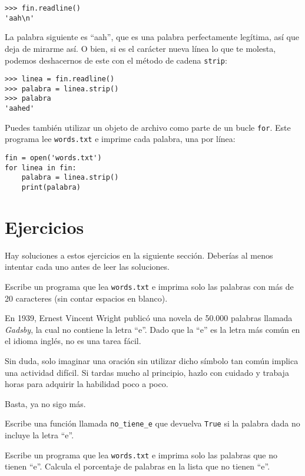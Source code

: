 \documentclass[10pt]{book}
\begin{document}
\begin{verbatim}
>>> fin.readline()
'aah\n'
\end{verbatim}
%
La palabra siguiente es ``aah'', que es una palabra perfectamente legítima,
así que deja de mirarme así.
O bien, si es el carácter nueva línea lo que te molesta,
podemos deshacernos de este con el método de cadena {\tt strip}:

\begin{verbatim}
>>> linea = fin.readline()
>>> palabra = linea.strip()
>>> palabra
'aahed'
\end{verbatim}
%
Puedes también utilizar un objeto de archivo como parte de un bucle {\tt for}.
Este programa lee {\tt words.txt} e imprime cada palabra, una
por línea:

\begin{verbatim}
fin = open('words.txt')
for linea in fin:
    palabra = linea.strip()
    print(palabra)
\end{verbatim}
%

\section{Ejercicios}

Hay soluciones a estos ejercicios en la siguiente sección.
Deberías al menos intentar cada uno antes de leer las soluciones.

\begin{exercise}
Escribe un programa que lea {\tt words.txt} e imprima solo las
palabras con más de 20 caracteres (sin contar espacios en blanco).

\end{exercise}

\begin{exercise}

En 1939, Ernest Vincent Wright publicó una novela de 50.000 palabras llamada
{\em Gadsby}, la cual no contiene la letra ``e''.  Dado que la ``e'' es
la letra más común en el idioma inglés, no es una tarea fácil.

Sin duda, solo imaginar una oración sin utilizar dicho símbolo tan común
implica una actividad difícil.  Si tardas mucho al principio, hazlo con cuidado
y trabaja horas para adquirir la habilidad poco a poco.

Basta, ya no sigo más.

Escribe una función llamada \verb"no_tiene_e" que devuelva {\tt True} si
la palabra dada no incluye la letra ``e''.

Escribe un programa que lea {\tt words.txt} e imprima solo las palabras
que no tienen ``e''.  Calcula el porcentaje de palabras en la lista
que no tienen ``e''.

\end{exercise}
\end{document}
